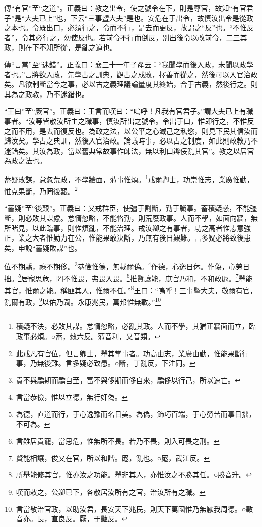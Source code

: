 {\noindent\zhuan{}\fzbyks 傳“有官”至“之道”。正義曰：教之出令，使之號令在下，則是尊官，故知“有官君子”是“大夫已上”也，下云“三事暨大夫”是也。安危在于出令，故慎汝出令是從政之本也。令既出口，必須行之，令而不行，是去而更反，故謂之“反”也。“不惟反者”，令其必行之，勿使反也。若前令不行而倒反，別出後令以改前令，二三其政，則在下不知所從，是亂之道也。 \par}

{\noindent\zhuan{}\fzbyks 傳“言當”至“迷錯”。正義曰：襄三十一年子產云：“我聞學而後入政，未聞以政學者也。”言將欲入政，先學古之訓典，觀古之成敗，擇善而從之，然後可以入官治政矣。凡欲制斷當今之事，必以古之義理議論量度其終始，合于古義，然後行之。則其為之政教，乃不迷錯也。 \par}

{\noindent\shu{}\fzkt “王曰”至“厥官”。正義曰：王言而嘆曰：“嗚呼！凡我有官君子。”謂大夫已上有職事者。“汝等皆敬汝所主之職事，慎汝所出之號令。令出于口，惟即行之，不惟反之而不用，是去而復反也。為政之法，以公平之心滅己之私慾，則見下民其信汝而歸汝矣。學古之典訓，然後入官治政。論議時事，必以古之制度，如此則政教乃不迷錯矣。其汝為政，當以舊典常故事作師法，無以利口辯佞亂其官”。教之以居官為政之法也。 \par}

蓄疑敗謀，怠忽荒政，不學牆面，蒞事惟煩。\footnote{積疑不決，必敗其謀。怠惰忽略，必亂其政。人而不學，其猶正牆面而立，臨政事必煩。○蓄，敕六反。蒞音利，又音類。}戒爾卿士，功崇惟志，業廣惟勤，惟克果斷，乃罔後艱。\footnote{此戒凡有官位，但言卿士，舉其掌事者。功高由志，業廣由勤，惟能果斷行事，乃無後難。言多疑必致患。○斷，丁亂反，下注同。}

{\noindent\shu{}\fzkt “蓄疑”至“後艱”。正義曰：又戒群臣，使彊于割斷，勤于職事。蓄積疑惑，不能彊斷，則必敗其謀慮。怠惰忽略，不能恪勤，則荒廢政事。人而不學，如面向牆，無所睹見，以此臨事，則惟煩亂，不能治理。戒汝卿之有事者，功之高者惟志意強正，業之大者惟勤力在公，惟能果敢決斷，乃無有後日艱難。言多疑必將致後患矣，申說“蓄疑敗謀”也。 \par}

位不期驕，祿不期侈。\footnote{貴不與驕期而驕自至，富不與侈期而侈自來，驕侈以行己，所以速亡。}恭儉惟德，無載爾偽。\footnote{言當恭儉，惟以立德，無行奸偽。}作德，心逸日休。作偽，心勞日拙。\footnote{為德，直道而行，于心逸豫而名日美。為偽，飾巧百端，于心勞苦而事日拙，不可為。}居寵思危，罔不惟畏，弗畏入畏。\footnote{言雖居貴寵，當思危，惟無所不畏。若乃不畏，則入可畏之刑。}推賢讓能，庶官乃和，不和政厖。\footnote{賢能相讓，俊乂在官，所以和諧。厖，亂也。○厖，武江反。}舉能其官，惟爾之能。稱匪其人，惟爾不任。”\footnote{所舉能修其官，惟亦汝之功能。舉非其人，亦惟汝之不勝其任。○勝音升。}王曰：“嗚呼！三事暨大夫，敬爾有官，亂爾有政，\footnote{嘆而敕之，公卿已下，各敬居汝所有之官，治汝所有之職。}以佑乃闢。永康兆民，萬邦惟無斁。”\footnote{言當敬治官政，以助汝君，長安天下兆民，則天下萬國惟乃無厭我周德。○斁音亦。長，直良反。厭，于豔反。}

